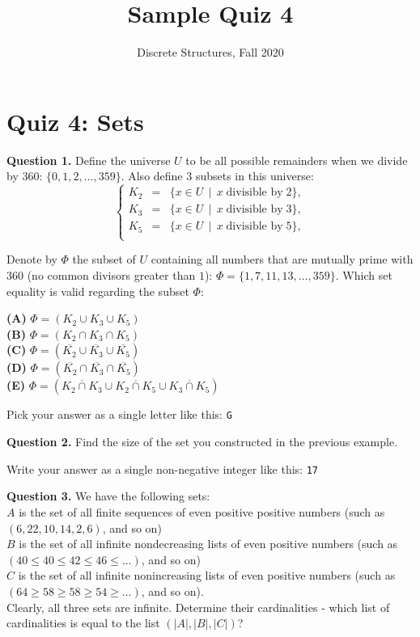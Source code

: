 \documentclass[jou]{apa6}
\title{Sample Quiz 4}
\author{Discrete Structures, Fall 2020}
\affiliation{RBS}
\begin{document}

\section{Quiz 4: Sets}

\vspace{10pt}
{\bf Question 1.} Define the universe $U$ to be all possible remainders 
when we divide by $360$: $\{ 0, 1, 2, \ldots, 359 \}$. 
Also define $3$ subsets in this universe: 
$$\left\{ \begin{array}{rcl}
K_2 & = & \{ x \in U \,\mid\, x\;\text{divisible by}\;2 \},\\
K_3 & = & \{ x \in U \,\mid\, x\;\text{divisible by}\;3 \},\\
K_5 & = & \{ x \in U \,\mid\, x\;\text{divisible by}\;5 \},\\
\end{array} \right.$$

Denote by $\Phi$ the subset of $U$ containing all numbers
that are mutually prime with $360$ (no common divisors greater than $1$):
$\Phi = \{1,7,11,13,\ldots,359\}$.
Which set equality is valid regarding the subset $\Phi$:

\noindent
{\bf (A)} $\Phi = \left( K_2 \cup K_3 \cup K_5 \right)$\\
{\bf (B)} $\Phi = \left( K_2 \cap K_3 \cap K_5 \right)$\\
{\bf (C)} $\Phi = \left( \overline{K_2} \cup \overline{K_3} \cup \overline{K_5} \right)$\\
{\bf (D)} $\Phi = \left( \overline{K_2} \cap \overline{K_3} \cap \overline{K_5} \right)$\\
{\bf (E)} $\Phi = \left( \overline{K_2 \cap K_3} \cup \overline{K_2 \cap K_5} \cup \overline{K_3 \cap K_5} \right)$


Pick your answer as a single letter like this: {\tt G}

\vspace{6pt}
{\bf Question 2.}
Find the size of the set you constructed in the previous example. 

Write your answer as a single non-negative integer like this: {\tt 17}


\vspace{6pt}
{\bf Question 3.} We have the following sets:\\
$A$ is the set of all finite sequences of even positive positive numbers (such as $(6,22,10,14,2,6)$, and so on)\\
$B$ is the set of all infinite nondecreasing lists of even positive numbers (such as $(40 \leq 40 \leq 42 \leq 46 \leq \ldots)$, and so on)\\
$C$ is the set of all infinite nonincreasing lists of even positive numbers (such as $(64 \geq 58 \geq 58 \geq 54 \geq \ldots)$, and so on).\\
Clearly, all three sets are infinite. Determine their cardinalities - which list 
of cardinalities is equal to the list  $(|A|,|B|,|C|)$?
\end{document}
